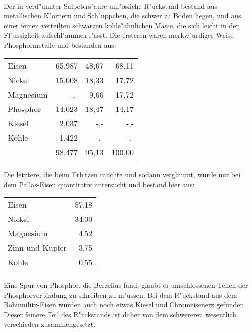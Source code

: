 \documentclass[a4paper, 11pt, oneside]{article}
\begin{document}
\paragraph{}
Der in verd"unnter Salpeters"aure unl"osliche R"uckstand bestand aus metallischen K"ornern und Sch"uppchen, die schwer zu Boden liegen, und aus einer feinen verteilten schwarzen kohle"ahnlichen Masse, die sich leicht in der Fl"ussigkeit aufschl"ammen l"asst. Die ersteren waren merkw"urdiger Weise Phosphormetalle und bestanden aus:
\begin{center}
\begin{tabular}{ l r r r }
    Eisen & 65,987 & 48,67 & 68,11\\
    Nickel & 15,008 & 18,33 & 17,72\\
    Magnesium & -,- & 9,66 & 17,72\\
    Phosphor & 14,023 & 18,47 & 14,17\\
    Kiesel & 2,037 & -,- & -,-\\
    Kohle & 1,422 & -,- & -,-\\
     & 98,477 & 95,13 & 100,00\\
\end{tabular}
\end{center}
\paragraph{}
Die letztere, die beim Erhitzen rauchte und sodann verglimmt, wurde nur bei dem Pallas-Eisen quantitativ untersucht und bestand hier aus:
\begin{center}
\begin{tabular}{ l r }
    Eisen & 57,18\\
    Nickel & 34,00\\
    Magnesium & 4,52\\
    Zinn und Kupfer & 3,75\\
    Kohle & 0,55\\
\end{tabular}
\end{center}
\paragraph{}
Eine Spur von Phosphor, die Berzelius fand, glaubt er umschlossenen Teilen der Phosphorverbindung zu schreiben zu m"ussen. Bei dem R"uckstand aus dem Bohumilitz-Eisen wurden auch noch etwas Kiesel und Chromeisenerz gefunden. Dieser feinere Teil des R"uckstands ist daher von dem schwereren wesentlich verschieden zusammengesetzt.
\end{document}

